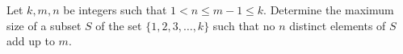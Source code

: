Let $k, m, n$ be integers such that $1 < n \leq m - 1 \leq k$. Determine the maximum size of a subset $S$ of the set $\{1, 2, 3, \ldots, k\}$ such that no $n$ distinct elements of $S$ add up to $m$.
